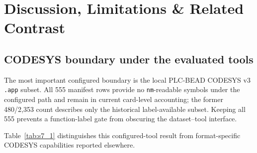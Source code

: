 \documentclass[manuscript,screen,review]{acmart}
\begin{document}

\section{Discussion, Limitations \& Related Contrast}

\subsection{CODESYS boundary under the evaluated tools}

The most important configured boundary is the local PLC-BEAD CODESYS v3 \texttt{.app} subset. All 555 manifest rows provide no \texttt{nm}-readable symbols under the configured path and remain in current card-level accounting; the former 480/2{,}353 count describes only the historical label-available subset. Keeping all 555 prevents a function-label gate from obscuring the dataset--tool interface.

Table~\ref{tab:s7_1} distinguishes this configured-tool result from format-specific CODESYS capabilities reported elsewhere.
\end{document}
